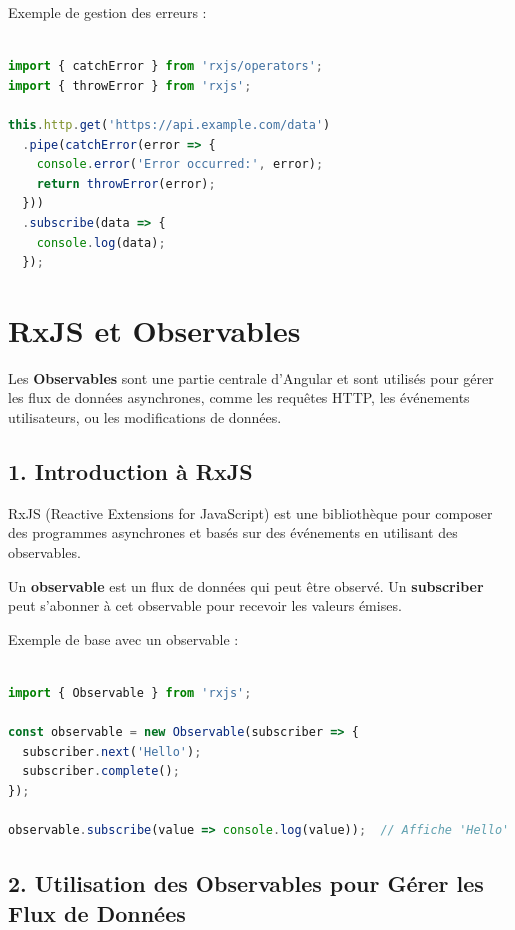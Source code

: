 \documentclass{article}
\begin{document}
Exemple de gestion des erreurs :
\begin{lstlisting}[language=TypeScript, caption={Using a service in a component}, label={lst:typescript-service-usage}]

import { catchError } from 'rxjs/operators';
import { throwError } from 'rxjs';

this.http.get('https://api.example.com/data')
  .pipe(catchError(error => {
    console.error('Error occurred:', error);
    return throwError(error);
  }))
  .subscribe(data => {
    console.log(data);
  });
\end{lstlisting}

\section*{RxJS et Observables}

Les \textbf{Observables} sont une partie centrale d'Angular et sont utilisés pour gérer les flux de données asynchrones, comme les requêtes HTTP, les événements utilisateurs, ou les modifications de données.

\subsection*{1. Introduction à RxJS}

RxJS (Reactive Extensions for JavaScript) est une bibliothèque pour composer des programmes asynchrones et basés sur des événements en utilisant des observables.

Un \textbf{observable} est un flux de données qui peut être observé. Un \textbf{subscriber} peut s’abonner à cet observable pour recevoir les valeurs émises.

Exemple de base avec un observable :
\begin{lstlisting}[language=TypeScript, caption={Using a service in a component}, label={lst:typescript-service-usage}]

import { Observable } from 'rxjs';

const observable = new Observable(subscriber => {
  subscriber.next('Hello');
  subscriber.complete();
});

observable.subscribe(value => console.log(value));  // Affiche 'Hello'
\end{lstlisting}

\subsection*{2. Utilisation des Observables pour Gérer les Flux de Données}
\end{document}
